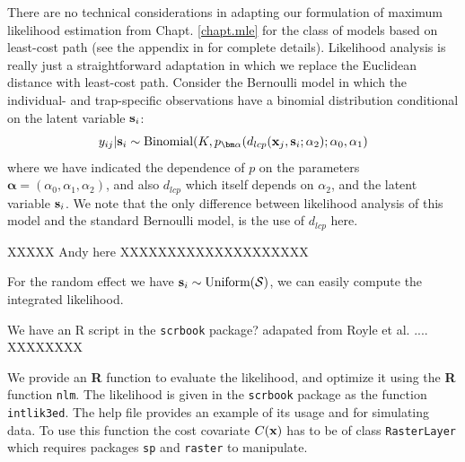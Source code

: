 There are no technical considerations in adapting our formulation of
maximum likelihood estimation \citep{borchers_efford:2008} from
Chapt. \ref{chapt.mle} for the class of models based on least-cost
path (see the appendix in \citet{royle_etal:2012ecol} for complete details).
Likelihood analysis is really just a straightforward adaptation in which we
replace the Euclidean distance with least-cost path.  Consider the
Bernoulli model in which the individual- and trap-specific
observations have a binomial distribution conditional on the latent
variable ${\bf s}_{i}$:
\begin{equation}
  y_{ij}| {\bf s}_{i} \sim \mbox{Binomial}(K, p_{\bm \alpha}(d_{lcp}({\bf x}_{j},{\bf s}_{i};\alpha_{2}); \alpha_{0}, \alpha_{1})
\label{ecoldist.eq.cond-on-s}
\end{equation}
where we have indicated the dependence of $p$ on the parameters
${\bm \alpha} =(\alpha_{0},\alpha_{1},\alpha_{2})$, and also $d_{lcp}$ which
itself depends on $\alpha_{2}$, and the latent variable ${\bf s}_i$.
We note that the only difference between likelihood analysis of this
model and the standard Bernoulli model, is the use of $d_{lcp}$ here.


XXXXX Andy here XXXXXXXXXXXXXXXXXXXX

For the random effect we have ${\bf s}_{i} \sim  \mbox{Uniform}({\cal
  S})$, we can easily compute the integrated likelihood.

We have an R script in the \mbox{\tt scrbook} package?
adapated from Royle et al. .... XXXXXXXX

We provide an {\bf R} function to evaluate the likelihood, and
optimize it
using the {\bf R} function \mbox{\tt nlm}.
The likelihood is given in the {\tt scrbook} package as the function
\mbox{\tt intlik3ed}. The help file
provides an example of its usage and for simulating data.
To use this function the cost covariate $C({\bf x})$ has to be of class
\mbox{\tt RasterLayer} which requires packages \mbox{\tt sp} and
\mbox{\tt raster} to manipulate.


